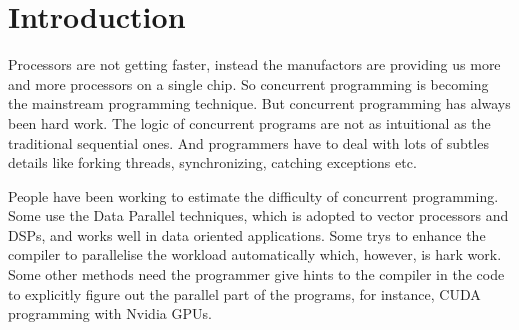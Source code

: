 \documentclass[conference]{IEEEtran}
\begin{document}
%



\section{Introduction}\label{sec:introduction}
Processors are not getting faster, instead the manufactors are providing us more and
more processors on a single chip. So concurrent programming is becoming the mainstream
programming technique. But concurrent programming has always been hard work. The logic
of concurrent programs are not as intuitional as the traditional sequential ones.
And programmers have to deal with lots of subtles details like forking threads,
synchronizing, catching exceptions etc.

People have been working to estimate the difficulty of concurrent programming. Some use
the Data Parallel techniques, which is adopted to vector processors and DSPs, and
works well in data oriented applications. Some trys to enhance the compiler to parallelise
the workload automatically which, however, is hark work. Some other methods need
the programmer give hints to the compiler in the code to explicitly figure out the parallel
part of the programs, for instance, CUDA programming with Nvidia GPUs.
\end{document}
